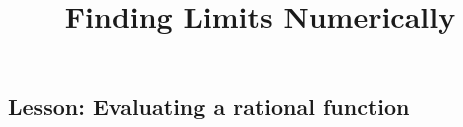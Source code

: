 \documentclass{ximera}
\title{Finding Limits Numerically}
\begin{document}
\begin{abstract}
\end{abstract}

\maketitle

\subsection{Lesson: Evaluating a rational function}
\begin{center}
\end{center}
\end{document}
